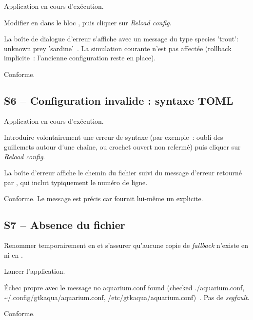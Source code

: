 \begin{description}[leftmargin=3em]
  \item[Préconditions.] Application en cours d'exécution.
  \item[Action.] Modifier  en
     dans le bloc , puis
    cliquer sur \emph{Reload config}.
  \item[Attendu.] La boîte de dialogue d'erreur s'affiche avec
    un message du type \og species 'trout': unknown prey
    'sardine'~\fg. La simulation courante n'est pas affectée
    (rollback implicite~: l'ancienne configuration reste en
    place).
  \item[Observé.] Conforme.
\end{description}

\subsection{S6 -- Configuration invalide : syntaxe TOML}

\begin{description}[leftmargin=3em]
  \item[Préconditions.] Application en cours d'exécution.
  \item[Action.] Introduire volontairement une erreur de
    syntaxe (par exemple~: oubli des guillemets autour d'une
    chaîne, ou crochet ouvert non refermé) puis cliquer sur
    \emph{Reload config}.
  \item[Attendu.] La boîte d'erreur affiche le chemin du
    fichier suivi du message d'erreur retourné par
    , qui inclut typiquement le numéro de
    ligne.
  \item[Observé.] Conforme. Le message est précis car
     fournit lui-même un  explicite.
\end{description}

\subsection{S7 -- Absence du fichier}

\begin{description}[leftmargin=3em]
  \item[Préconditions.] Renommer temporairement
     en  et
    s'assurer qu'aucune copie de \emph{fallback} n'existe en
     ni en
    .
  \item[Action.] Lancer l'application.
  \item[Attendu.] Échec propre avec le message \og no
    aquarium.conf found (checked ./aquarium.conf,
    \textasciitilde/.config/gtkaqua/aquarium.conf,
    /etc/gtkaqua/aquarium.conf)~\fg. Pas de \emph{segfault}.
  \item[Observé.] Conforme.
\end{description}

